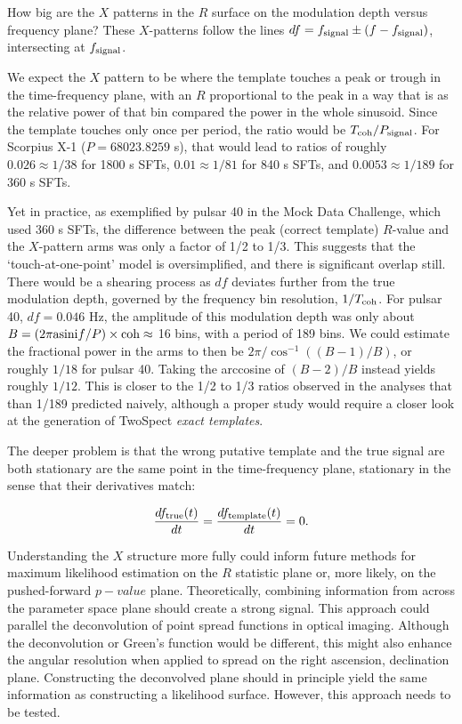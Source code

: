             How big are the $X$ patterns in the $R$ surface on the modulation depth versus frequency plane?
These $X$-patterns follow the lines $df = f_{\textup{signal}} \pm (f - f_\textup{signal})$, intersecting at $f_\textup{signal}$.

We expect the $X$ pattern to be where the template touches a peak or trough in the time-frequency plane, with an $R$ proportional to the peak in a way that is as the relative power of that bin compared the power in the whole sinusoid. 
Since the template touches only once per period, the ratio would be $T_{\textup{coh}} / P_{\textup{signal}}$. For Scorpius X-1 ($P = 68023.8259$ s), that would lead to ratios of roughly $0.026 \approx 1/38$ for 1800 s SFTs, $0.01 \approx 1/81$ for 840 s SFTs, and $0.0053 \approx 1/189$ for 360 s SFTs.

Yet in practice, as exemplified by pulsar 40 in the Mock Data Challenge, which used 360 s SFTs, the difference between the peak (correct template) $R$-value and the $X$-pattern arms was only a factor of 1/2 to 1/3.
This suggests that the `touch-at-one-point' model is oversimplified, and there is significant overlap still.
There would be a shearing process as $df$ deviates further from the true modulation depth, governed by the frequency bin resolution, $1/T_\textup{coh}$. 
For pulsar 40, $df = 0.046$ Hz, the amplitude of this modulation depth was only about $B = \left(2 \pi \textup{asini} f / P \right) \times \textup{coh} \approx $ 16 bins, with a period of 189 bins.
We could estimate the fractional power in the arms to then be $2 \pi / \cos^{-1} ((B-1) / B)$, or roughly $1/18$ for pulsar 40.
Taking the arccosine of $(B-2)/B$ instead yields roughly $1/12$.
This is closer to the 1/2 to 1/3 ratios observed in the analyses that than 1/189 predicted naively, although a proper study would require a closer look at the generation of TwoSpect \textit{exact templates}.

The deeper problem is that the wrong putative template and the true signal are both stationary are the same point in the time-frequency plane, stationary in the sense that their derivatives match:

\begin{equation}
\frac{df_\textup{true} (t)}{dt} = \frac{df_\textup{template}(t)}{dt} = 0.
\end{equation}

Understanding the $X$ structure more fully could inform future methods for maximum likelihood estimation on the $R$ statistic plane or, more likely, on the pushed-forward $p-value$ plane.
Theoretically, combining information from across the parameter space plane should create a strong signal.
This approach could parallel the deconvolution of point spread functions in optical imaging.
Although the deconvolution or Green's function would be different, this might also enhance the angular resolution when applied to spread on the right ascension, declination plane.
Constructing the deconvolved plane should in principle yield the same information as constructing a likelihood surface.
However, this approach needs to be tested.

